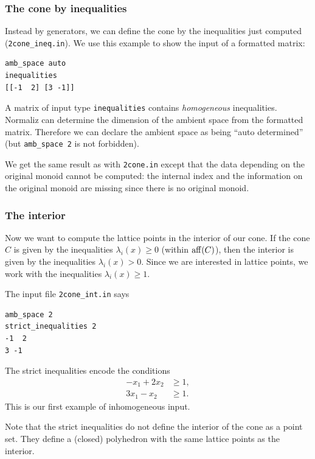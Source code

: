 \subsubsection{The cone by inequalities}\label{ineq_ex}

Instead by generators, we can define the cone by the inequalities just computed (\verb|2cone_ineq.in|). We use this example to show the input of a formatted matrix:
\begin{Verbatim}
amb_space auto
inequalities
[[-1  2] [3 -1]]
\end{Verbatim}
A matrix of input type \verb|inequalities| contains \emph{homogeneous} inequalities. Normaliz can determine the dimension of the ambient space from the formatted matrix. Therefore we can declare the ambient space as being ``auto determined'' (but \verb|amb_space 2| is not forbidden).

We get the same result as with \verb|2cone.in| except that the data depending on the original monoid cannot be computed: the internal index and the information on the original monoid are missing since there is no original monoid.

\subsubsection{The interior}\label{strict_ex}
Now we want to compute the lattice points in the interior of our cone. If the cone $C$ is given by the inequalities $\lambda_i(x)\ge0$ (within $\operatorname{aff}(C)$), then the interior is given by the inequalities $\lambda_i(x)>0$. Since we are interested in lattice points, we work with the inequalities $\lambda_i(x)\ge 1$.


The input file \verb|2cone_int.in| says
\begin{Verbatim}
amb_space 2
strict_inequalities 2
-1  2
3 -1
\end{Verbatim}
The strict inequalities encode the conditions
\begin{align*}
-x_1+2x_2&\ge 1,\\
3x_1-x_2&\ge 1.
\end{align*}
This is our first example of inhomogeneous input.

Note that the strict inequalities do not define the interior of the cone as a point set. They define a (closed) polyhedron with the same lattice points as the interior.

